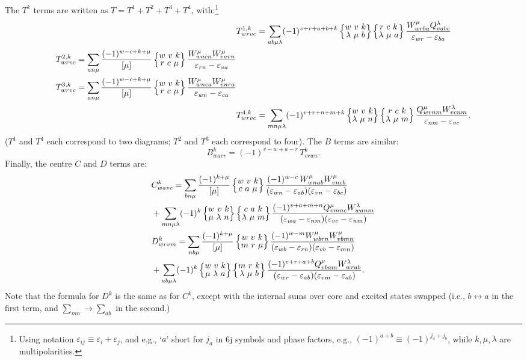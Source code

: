 \documentclass[10pt,twocolumn,a4paper]{article}%
\newcommand{\sixjs}[6]{\renewcommand\arraystretch{0.75}\ensuremath{\begin{Bmatrix}#1~#2~#3\\#4~#5~#6\end{Bmatrix}}}	%
\newcommand{\be}{\begin{equation}}
\newcommand{\ee}{\end{equation}}
\def\en{\ensuremath{\varepsilon}}
\begin{document}
The $T^k$ terms are written as
$T=T^1+T^2+T^3+T^4$, with:\footnote{Using notation
$\en_{ij}\equiv\en_i+\en_j$, and e.g., `$a$' short for $j_a$ in 6j symbols and phase factors, e.g.,
$(-1)^{a+b}\equiv(-1)^{j_a + j_b}$, while $k$,\,$\mu$,\,$\lambda$ are multipolarities.}
\begin{align}
&\notag
T^{1,k}_{wrvc} = 
\sum_{ab\mu\lambda}(-1)^{v+r+a+b+k}
\sixjs{w}{v}{k}{\lambda}{\mu}{b}
\sixjs{r}{c}{k}{\lambda}{\mu}{a}
\frac{W^\mu_{wrba}Q^\lambda_{vabc}}{\en_{wr}-\en_{ba}}
\\
\begin{split}
&T^{2,k}_{wrvc} = 
\sum_{an\mu}\frac{(-1)^{w-c+k+\mu}}{[\mu]}
\sixjs{w}{v}{k}{r}{c}{\mu}
\frac{W^\mu_{wacn}W^\mu_{varn}}{\en_{rn}-\en_{va}}
\\
&T^{3,k}_{wrvc} = 
\sum_{an\mu}\frac{(-1)^{w-c+k+\mu}}{[\mu]}
\sixjs{w}{v}{k}{r}{c}{\mu}
\frac{W^\mu_{wnca}W^\mu_{vnra}}{\en_{wn}-\en_{ca}}
\end{split}
\\
&\notag
T^{4,k}_{wrvc} = 
\sum_{mn\mu\lambda}(-1)^{v+r+n+m+k}
\sixjs{w}{v}{k}{\lambda}{\mu}{n}
\sixjs{r}{c}{k}{\lambda}{\mu}{m}
\frac{Q^\mu_{wrnm}W^\lambda_{vcnm}}{\en_{nm}-\en_{vc}}.
\end{align}
($T^1$ and $T^4$ each correspond to two diagrams; $T^2$ and $T^3$ each correspond to four).
The $B$ terms are similar:
\be
B^{k}_{wavr} = (-1)^{v-w+a-r}\,T^{k}_{vrwa}.
\ee
%
Finally, the centre $C$ and $D$ terms are:
\begin{align}
&\notag
C^{k}_{wavc} = 
\sum_{bn\mu}\frac{(-1)^{k+\mu}}{[\mu]}
\sixjs{w}{v}{k}{c}{a}{\mu}
\frac{(-1)^{w-c}\,W^\mu_{wnab}W^\mu_{vncb}}{(\en_{wn}-\en_{ab})(\en_{vn}-\en_{bc})}
\\
&+\sum_{mn\mu\lambda}(-1)^{k}
\sixjs{w}{v}{k}{\mu}{\lambda}{n}
\sixjs{c}{a}{k}{\lambda}{\mu}{m}
\frac{(-1)^{v+a+m+n}Q^\mu_{vmnc}W^\lambda_{wanm}}{(\en_{wa}-\en_{nm})(\en_{vc}-\en_{nm})}
\\
&\notag
D^{k}_{wrvm} = 
\sum_{nb\mu}\frac{(-1)^{k+\mu}}{[\mu]}
\sixjs{w}{v}{k}{m}{r}{\mu}
\frac{(-1)^{w-m}W^\mu_{wbrn}W^\mu_{vbmn}}{(\en_{wb}-\en_{rn})(\en_{vb}-\en_{mn})}
\\
&\notag+
\sum_{ab\mu\lambda}(-1)^{k}
\sixjs{w}{v}{k}{\mu}{\lambda}{a}
\sixjs{m}{r}{k}{\lambda}{\mu}{b}
\frac{(-1)^{v+r+a+b}Q^\mu_{vbam}W^\lambda_{wrab}}{(\en_{wr}-\en_{ab})(\en_{vm}-\en_{ab})}.
\end{align}
Note that the formula for $D^k$ is the same as for $C^k$, except with the internal sums over core and excited states swapped
(i.e., $b\leftrightarrow a$ in the first term, and $\sum_{mn}\to\sum_{ab}$ in the second.)
\end{document}
